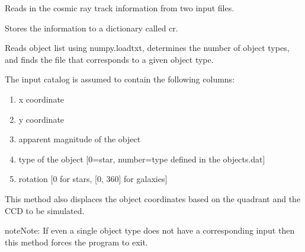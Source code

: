 \documentclass[a4paper,12pt,english]{sphinxmanual}
\begin{document}
\begin{fulllineitems}
\begin{fulllineitems}
\end{fulllineitems}


\begin{fulllineitems}
\label{simulator:simulator.simulator.VISsimulator.readCosmicRayInformation}
Reads in the cosmic ray track information from two input files.

Stores the information to a dictionary called cr.

\end{fulllineitems}


\begin{fulllineitems}
\label{simulator:simulator.simulator.VISsimulator.readObjectlist}
Reads object list using numpy.loadtxt, determines the number of object types,
and finds the file that corresponds to a given object type.

The input catalog is assumed to contain the following columns:
\begin{enumerate}
\item {} 
x coordinate

\item {} 
y coordinate

\item {} 
apparent magnitude of the object

\item {} 
type of the object {[}0=star, number=type defined in the objects.dat{]}

\item {} 
rotation {[}0 for stars, {[}0, 360{]} for galaxies{]}

\end{enumerate}

This method also displaces the object coordinates based on the quadrant and the
CCD to be simulated.

\begin{notice}{note}{Note:}
If even a single object type does not have a corresponding input then this method
forces the program to exit.
\end{notice}

\end{fulllineitems}



\end{fulllineitems}
\end{document}

